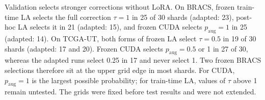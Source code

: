 Validation selects stronger corrections without LoRA. On BRACS, frozen train-time LA selects the full correction $\tau=1$ in 25 of 30 shards (adapted: 23), post-hoc LA selects it in 21 (adapted: 15), and frozen CUDA selects $p_{\mathrm{aug}}=1$ in 25 (adapted: 14). On TCGA-UT, both forms of frozen LA select $\tau=0.5$ in 19 of 30 shards (adapted: 17 and 20). Frozen CUDA selects $p_{\mathrm{aug}}=0.5$ or 1 in 27 of 30, whereas the adapted runs select 0.25 in 17 and never select 1. Two frozen BRACS selections therefore sit at the upper grid edge in most shards. For CUDA, $p_{\mathrm{aug}}=1$ is the largest possible probability; for train-time LA, values of $\tau$ above 1 remain untested. The grids were fixed before test results and were not extended.
